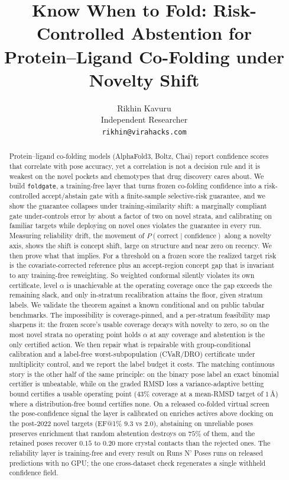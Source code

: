 \documentclass[10pt]{article}
\title{\vspace{-2.2em}\textbf{\large Know When to Fold: Risk-Controlled Abstention for\\
Protein--Ligand Co-Folding under Novelty Shift}}
\author{Rikhin Kavuru\\ \small Independent Researcher \\ \small \texttt{rikhin@virahacks.com}}
\date{}
\begin{document}
\maketitle
\vspace{-2.4em}

\begin{abstract}
\small
Protein--ligand co-folding models (AlphaFold3, Boltz, Chai) report confidence scores that
correlate with pose accuracy, yet a correlation is not a decision rule and it is weakest on
the novel pockets and chemotypes that drug discovery cares about. We build \texttt{foldgate},
a training-free layer that turns frozen co-folding confidence into a risk-controlled
accept/abstain gate with a finite-sample selective-risk guarantee, and we show the guarantee
collapses under training-similarity shift: a marginally compliant gate under-controls error by
about a factor of two on novel strata, and calibrating on familiar targets while deploying on novel
ones violates the guarantee in every run. Measuring reliability drift, the movement of
$P(\text{correct}\mid\text{confidence})$ along a novelty axis, shows the shift is concept shift,
large on structure and near zero on recency. We then prove what that implies. For a threshold on a
frozen score the realized target risk is the covariate-corrected reference plus an accept-region
concept gap that is invariant to any training-free reweighting. So weighted conformal silently
violates its own certificate, level $\alpha$ is unachievable at the operating coverage once the gap
exceeds the remaining slack, and only in-stratum recalibration attains the floor, given stratum
labels. We validate the theorem against a known conditional and on public tabular benchmarks. The
impossibility is coverage-pinned, and a per-stratum feasibility map sharpens it: the frozen score's
usable coverage decays with novelty to zero, so on the most novel strata no operating point holds
$\alpha$ at any coverage and abstention is the only certified action. We then repair what is
repairable with group-conditional calibration and a label-free worst-subpopulation (CVaR/DRO)
certificate under multiplicity control, and we report the label budget it costs. The matching
continuous story is the other half of the same principle: on the binary pose label an exact
binomial certifier is unbeatable, while on the graded RMSD loss a variance-adaptive betting bound
certifies a usable operating point ($43\%$ coverage at a mean-RMSD target of $1$\,\AA) where a
distribution-free bound certifies none. On a released co-folded virtual screen the pose-confidence
signal the layer is calibrated on enriches actives above docking on the post-2022 novel targets
(EF@1\% $9.3$ vs $2.0$), abstaining on unreliable poses preserves enrichment that random abstention
destroys on $75\%$ of them, and the retained poses recover $0.15$ to $0.20$ more crystal contacts
than the rejected ones. The reliability layer is training-free and every result on Runs N' Poses
runs on released predictions with no GPU; the one cross-dataset check regenerates a single withheld
confidence field.
\end{abstract}
\end{document}
